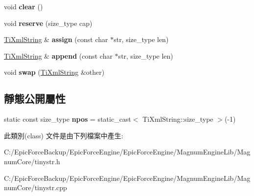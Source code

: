 \begin{DoxyCompactItemize}
\item 
void {\bfseries clear} ()\hypertarget{class_ti_xml_string_ab20e06e4c666abf3bdbfb3a1191d4888}{}\label{class_ti_xml_string_ab20e06e4c666abf3bdbfb3a1191d4888}

\item 
void {\bfseries reserve} (size\+\_\+type cap)\hypertarget{class_ti_xml_string_a88ecf9f0f00cb5c67b6b637958d7049c}{}\label{class_ti_xml_string_a88ecf9f0f00cb5c67b6b637958d7049c}

\item 
\hyperlink{class_ti_xml_string}{Ti\+Xml\+String} \& {\bfseries assign} (const char $\ast$str, size\+\_\+type len)\hypertarget{class_ti_xml_string_ac72f3d9149b7812c1e6c59402014d0d5}{}\label{class_ti_xml_string_ac72f3d9149b7812c1e6c59402014d0d5}

\item 
\hyperlink{class_ti_xml_string}{Ti\+Xml\+String} \& {\bfseries append} (const char $\ast$str, size\+\_\+type len)\hypertarget{class_ti_xml_string_ad44b21700d2ec24a511367b222b643fb}{}\label{class_ti_xml_string_ad44b21700d2ec24a511367b222b643fb}

\item 
void {\bfseries swap} (\hyperlink{class_ti_xml_string}{Ti\+Xml\+String} \&other)\hypertarget{class_ti_xml_string_aa392cbc180752a79f007f4f9280c7762}{}\label{class_ti_xml_string_aa392cbc180752a79f007f4f9280c7762}

\end{DoxyCompactItemize}
\subsection*{靜態公開屬性}
\begin{DoxyCompactItemize}
\item 
static const size\+\_\+type {\bfseries npos} = static\+\_\+cast$<$ Ti\+Xml\+String\+::size\+\_\+type $>$(-\/1)\hypertarget{class_ti_xml_string_a8f4422d227088dc7bec96f479b275d0a}{}\label{class_ti_xml_string_a8f4422d227088dc7bec96f479b275d0a}

\end{DoxyCompactItemize}


此類別(class) 文件是由下列檔案中產生\+:\begin{DoxyCompactItemize}
\item 
C\+:/\+Epic\+Force\+Backup/\+Epic\+Force\+Engine/\+Epic\+Force\+Engine/\+Magnum\+Engine\+Lib/\+Magnum\+Core/tinystr.\+h\item 
C\+:/\+Epic\+Force\+Backup/\+Epic\+Force\+Engine/\+Epic\+Force\+Engine/\+Magnum\+Engine\+Lib/\+Magnum\+Core/tinystr.\+cpp\end{DoxyCompactItemize}
